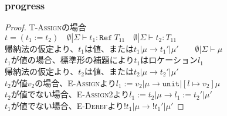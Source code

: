 \documentclass[dvipdfmx,cjk,xcolor=dvipsnames,envcountsect,notheorems]{beamer}
\theoremstyle{definition}
\newcommand{\REFT}{\texttt{Ref}}
\newcommand{\UNIT}{\texttt{unit}}
\begin{document}
\begin{frame}
	\frametitle{progress}
	\Large
	\begin{proof}
		\textsc{T-Assign}の場合\\
		$t = (t_1:=t_2) \quad \emptyset | \Sigma \vdash t_1 : \REFT~T_{11} \quad \emptyset | \Sigma \vdash t_2 : T_{11}$\\
		帰納法の仮定より、$t_1$は値、または$t_1|\mu\rightarrow t_1'|\mu' \qquad \emptyset | \Sigma \vdash \mu$ \\
		$t_1$が値の場合、標準形の補題により$t_1$はロケーション$l_1$\\
		帰納法の仮定より、$t_2$は値、または$t_2|\mu\rightarrow t_2'|\mu'$\\
		$t_2$が値$v_2$の場合、\textsc{E-Assign}より$l_1:=v_2|\mu\rightarrow \UNIT | [l\mapsto v_2]\mu$\\
		$t_2$が値でない場合、\textsc{E-Assign2}より$l_1:=t_2|\mu \rightarrow l_1:=t_2' | \mu'$\\
		$t_1$が値でない場合、\textsc{E-Deref}より$!t_1 | \mu \rightarrow !t_1' | \mu'$
	\end{proof}
\end{frame}
\end{document}
